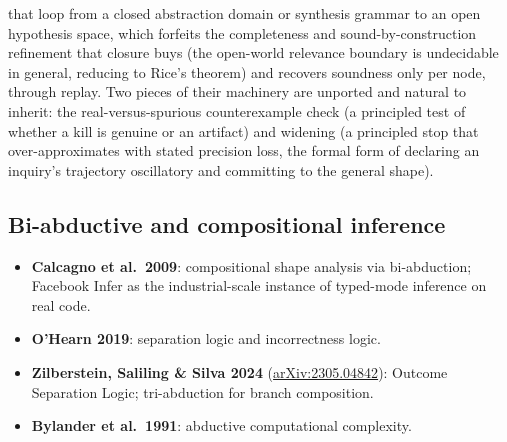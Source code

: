 \documentclass[
  10pt,
]{article}
\providecommand{\tightlist}{%
  \setlength{\itemsep}{0pt}\setlength{\parskip}{0pt}}
\begin{document}
\begin{itemize}
  that loop from a closed abstraction domain or synthesis grammar to an
  open hypothesis space, which forfeits the completeness and
  sound-by-construction refinement that closure buys (the open-world
  relevance boundary is undecidable in general, reducing to Rice's
  theorem) and recovers soundness only per node, through replay. Two
  pieces of their machinery are unported and natural to inherit: the
  real-versus-spurious counterexample check (a principled test of
  whether a kill is genuine or an artifact) and widening (a principled
  stop that over-approximates with stated precision loss, the formal
  form of declaring an inquiry's trajectory oscillatory and committing
  to the general shape).
\end{itemize}

\subsection{Bi-abductive and compositional
inference}\label{bi-abductive-and-compositional-inference}

\begin{itemize}
\tightlist
\item
  \textbf{Calcagno et al.~2009}: compositional shape analysis via
  bi-abduction; Facebook Infer as the industrial-scale instance of
  typed-mode inference on real code.
\item
  \textbf{O'Hearn 2019}: separation logic and incorrectness logic.
\item
  \textbf{Zilberstein, Saliling \& Silva 2024}
  (\href{https://arxiv.org/abs/2305.04842}{arXiv:2305.04842}): Outcome
  Separation Logic; tri-abduction for branch composition.
\item
  \textbf{Bylander et al.~1991}: abductive computational complexity.
\end{itemize}
\end{document}
